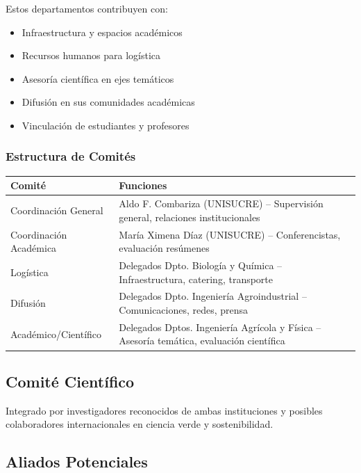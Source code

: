 \documentclass[12pt,a4paper]{article}
\begin{document}
Estos departamentos contribuyen con:
\begin{itemize}[label={\textcolor{verdemid}{\textbullet}}]
  \item Infraestructura y espacios académicos
  \item Recursos humanos para logística
  \item Asesoría científica en ejes temáticos
  \item Difusión en sus comunidades académicas
  \item Vinculación de estudiantes y profesores
\end{itemize}

\subsubsection{Estructura de Comités}

\begin{table}[H]
\centering
\small
\begin{tabular}{|l|p{10cm}|}
\hline
\rowcolor{verdeclaro}
\textbf{Comité} & \textbf{Funciones} \\
\hline
Coordinación General & Aldo F. Combariza (UNISUCRE) -- Supervisión general, relaciones institucionales \\
\hline
Coordinación Académica & María Ximena Díaz (UNISUCRE) -- Conferencistas, evaluación resúmenes \\
\hline
Logística & Delegados Dpto. Biología y Química -- Infraestructura, catering, transporte \\
\hline
Difusión & Delegados Dpto. Ingeniería Agroindustrial -- Comunicaciones, redes, prensa \\
\hline
Académico/Científico & Delegados Dptos. Ingeniería Agrícola y Física -- Asesoría temática, evaluación científica \\
\hline
\end{tabular}
\end{table}

\subsection{Comité Científico}

Integrado por investigadores reconocidos de ambas instituciones y posibles colaboradores internacionales en ciencia verde y sostenibilidad.

\subsection{Aliados Potenciales}
\end{document}
